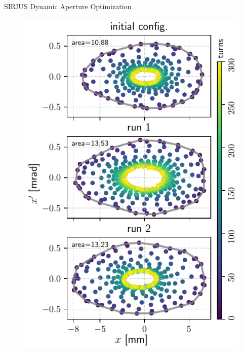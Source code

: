 \documentclass[aspectratio=169]{beamer}
\begin{document}
\begin{frame}{SIRIUS Dynamic Aperture Optimization}
\begin{minipage}{0.44\textwidth}
\begin{figure}
            \includegraphics[height=0.9\textheight]{WEPL087_f4.pdf}
        \end{figure}
    \end{minipage}
\end{frame}
\end{document}
